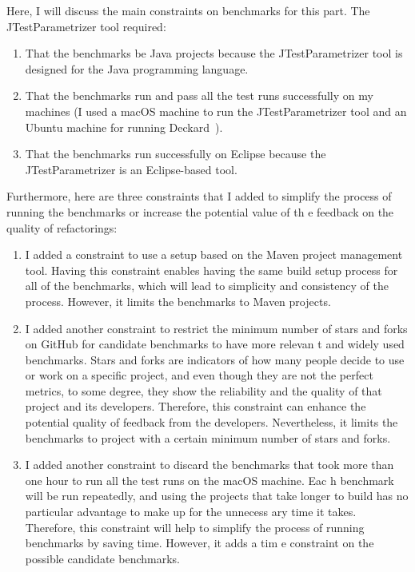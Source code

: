 Here, I will discuss the main constraints on benchmarks for this part. The JTestParametrizer tool required:
\begin{enumerate}
  \item That the benchmarks be Java projects because the JTestParametrizer tool is designed for the Java programming language.
  \item That the benchmarks run and pass all the test runs successfully on my machines (I used a macOS machine to run the JTestParametrizer 
tool and an Ubuntu machine for running Deckard~\cite{DECKARD}).
  \item That the benchmarks run successfully on Eclipse because the JTestParametrizer is an Eclipse-based tool.
\end{enumerate}

Furthermore, here are three constraints that I added to simplify the process of running the benchmarks or increase the potential value of th
e feedback on the quality of refactorings:
\begin{enumerate}
  \item I added a constraint to use a setup based on the Maven project management tool. Having this constraint enables having the same build
 setup process for all of the benchmarks, which will lead to simplicity and consistency of the process. However, it limits the benchmarks to
 Maven projects.
  \item I added another constraint to restrict the minimum number of stars and forks on GitHub for candidate benchmarks to have more relevan
t and widely used benchmarks. Stars and forks are indicators of how many people decide to use or work on a specific project, and even though
 they are not the perfect metrics, to some degree, they show the reliability and the quality of that project and its developers. Therefore, 
this constraint can enhance the potential quality of feedback from the developers. Nevertheless, it limits the benchmarks to project with a 
certain minimum number of stars and forks.
  \item I added another constraint to discard the benchmarks that took more than one hour to run all the test runs on the macOS machine. Eac
h benchmark will be run repeatedly, and using the projects that take longer to build has no particular advantage to make up for the unnecess
ary time it takes. Therefore, this constraint will help to simplify the process of running benchmarks by saving time. However, it adds a tim
e constraint on the possible candidate benchmarks.
\end{enumerate}

